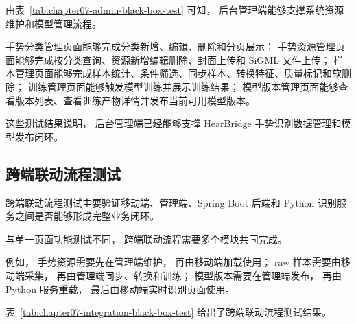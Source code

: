 由表~\ref{tab:chapter07-admin-black-box-test} 可知，
后台管理端能够支撑系统资源维护和模型管理流程。

手势分类管理页面能够完成分类新增、编辑、删除和分页展示；
手势资源管理页面能够完成按分类查询、资源新增编辑删除、封面上传和 SiGML 文件上传；
样本管理页面能够完成样本统计、条件筛选、同步样本、转换特征、质量标记和软删除；
训练管理页面能够触发模型训练并展示训练结果；
模型版本管理页面能够查看版本列表、查看训练产物详情并发布当前可用模型版本。

这些测试结果说明，
后台管理端已经能够支撑 HearBridge 手势识别数据管理和模型发布闭环。

\subsection{跨端联动流程测试}

跨端联动流程测试主要验证移动端、管理端、Spring Boot 后端和 Python 识别服务之间是否能够形成完整业务闭环。

与单一页面功能测试不同，
跨端联动流程需要多个模块共同完成。

例如，
手势资源需要先在管理端维护，
再由移动端加载使用；
raw 样本需要由移动端采集，
再由管理端同步、转换和训练；
模型版本需要在管理端发布，
再由 Python 服务重载，
最后由移动端实时识别页面使用。

表~\ref{tab:chapter07-integration-black-box-test} 给出了跨端联动流程测试结果。

